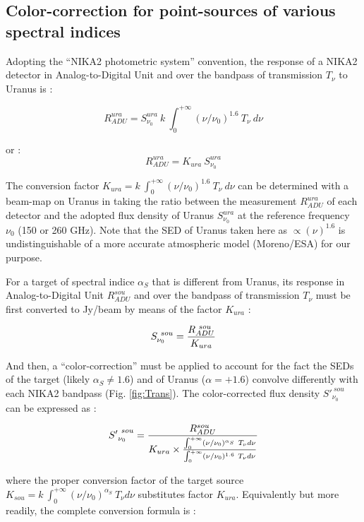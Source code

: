 
\subsection{Color-correction for point-sources of various spectral indices}
\label{ap:color_correction_JFL}

Adopting  the ``NIKA2 photometric system'' convention, the response of a NIKA2 detector in Analog-to-Digital Unit and over the bandpass 
of transmission $T_{\nu}$ to Uranus is :

$$ R_{ADU}^{ura} =  S_{\nu_0}^{ura}~ k~\int_{0}^{+\infty} (\nu /\nu_0)^{1.6} ~ T_{\nu} ~ d\nu  $$

\null

\noindent or : $$ R_{ADU}^{ura} = K_{ura}  ~ S_{\nu_0}^{ura} $$

\null

\noindent The conversion factor   $K_{ura}  = k ~
\int_{0}^{+\infty} (\nu /\nu_0)^{1.6} ~ T_{\nu} ~ d\nu $ can be
determined with a beam-map on Uranus in taking the ratio between the measurement $R_{ADU}^{ura}$ of each detector and 
the adopted flux density of Uranus $S_{\nu_0}^{ura}$ at the reference frequency $\nu_0$ (150 or 260 GHz).
Note that the SED of Uranus taken here as $\propto (\nu)^{1.6}$  is undistinguishable of a more
accurate atmospheric model  (Moreno/ESA) for our purpose.


For a target of spectral indice  $\alpha_{S}$ that is different from Uranus,  
its  response in Analog-to-Digital Unit $R_{ADU}^{sou}$    and over the bandpass
of transmission $T_{\nu}$ must be first converted to Jy/beam by means of the factor $K_{ura}$ :

$$ S_{\nu_0}^{~sou} =  {R_{ADU}^{~ sou} \over K_{ura}} $$

\noindent And then, a ``color-correction'' must be applied to account for the fact the SEDs of the target (likely $\alpha_{S} \ne 1.6$) 
and of Uranus ($\alpha=+1.6$) convolve differently with
each NIKA2 bandpass (Fig. \ref{fig:Trans}). The color-corrected flux density ${S'}_{\nu_0}^{~sou}$ can be expressed as :

$$ {S'}_{\nu_0}^{~sou} =  {R_{ADU}^{sou} \over { K_{ura} \times {{{\int_{0}^{+\infty} (\nu /\nu_0)^{\alpha_{S}} ~ T_{\nu} d\nu }  } \over { \int_{0}^{+\infty} (\nu /\nu_0)^{1.6} ~ T_{\nu} d\nu  }}}}  $$


\noindent where the proper conversion factor of the target source 
$K_{sou}=k ~ \int_{0}^{+\infty} (\nu /\nu_0)^{\alpha_S} ~ T_{\nu} d\nu $ substitutes factor $K_{ura}$.  Equivalently but more readily, the complete conversion formula is  :

